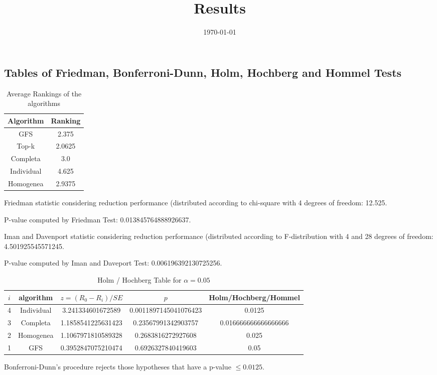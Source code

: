 \documentclass[a4paper,10pt]{article}
\title{Results}
\author{}
\date{\today}
\begin{document}
\begin{landscape}
\oddsidemargin 0in \topmargin 0in\maketitle
\section{Tables of Friedman, Bonferroni-Dunn, Holm, Hochberg and Hommel Tests}
\begin{table}[!htp]
\centering
\caption{Average Rankings of the algorithms
}\begin{tabular}{c|c}
Algorithm&Ranking\\
\hline
GFS&2.375\\
Top-k&2.0625\\
Completa&3.0\\
Individual&4.625\\
Homogenea&2.9375\\
\end{tabular}
\end{table}


Friedman statistic considering reduction performance (distributed according to chi-square with 4 degrees of freedom: 12.525.


P-value computed by Friedman Test: 0.013845764888926637.\newline

Iman and Davenport statistic considering reduction performance (distributed according to F-distribution with 4 and 28 degrees of freedom: 4.501925545571245.


P-value computed by Iman and Daveport Test: 0.006196392130725256.\newline

\begin{table}[!htp]
\centering\tiny
\caption{Holm / Hochberg Table for $\alpha=0.05$}
\begin{tabular}{ccccc}
$i$&algorithm&$z=(R_0 - R_i)/SE$&$p$&Holm/Hochberg/Hommel\\
\hline
4&Individual&3.241334601672589&0.0011897145041076423&0.0125\\
3&Completa&1.1858541225631423&0.23567991342903757&0.016666666666666666\\
2&Homogenea&1.1067971810589328&0.2683816272927608&0.025\\
1&GFS&0.3952847075210474&0.6926327840419603&0.05\\
\hline
\end{tabular}
\end{table}
Bonferroni-Dunn's procedure rejects those hypotheses that have a p-value $\le0.0125$.



\end{landscape}
\end{document}
